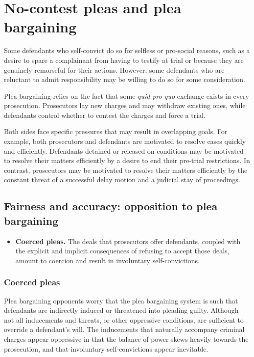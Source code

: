\section{No-contest pleas and plea bargaining}

Some defendants who self-convict do so for selfless or pro-social reasons, such as a desire to spare a complainant from having to testify at trial or because they are genuinely remorseful for their actions. However, some defendants who are reluctant to admit responsibility may be willing to do so for some consideration.

Plea bargaining relies on the fact that some \textit{quid pro quo} exchange exists in every prosecution. Prosecutors lay new charges and may withdraw existing ones, while defendants control whether to contest the charges and force a trial. 

Both sides face specific pressures that may result in overlapping goals. For example, both prosecutors and defendants are motivated to resolve cases quickly and efficiently. Defendants detained or released on conditions may be motivated to resolve their matters efficiently by a desire to end their pre-trial restrictions. In contrast, prosecutors may be motivated to resolve their matters efficiently by the constant threat of a successful delay motion and a judicial stay of proceedings.


\subsection{Fairness and accuracy: opposition to plea bargaining}

\begin{itemize}
\item \textbf{Coerced pleas.} The deals that prosecutors offer defendants, coupled with the explicit and implicit consequences of refusing to accept those deals, amount to coercion and result in involuntary self-convictions.
\end{itemize}

\subsubsection{Coerced pleas}

Plea bargaining opponents worry that the plea bargaining system is such that defendants are indirectly induced or threatened into pleading guilty. Although not all inducements and threats, or other oppressive conditions, are sufficient to override a defendant's will. The inducements that naturally accompany criminal charges appear oppressive in that the balance of power skews heavily towards the prosecution, and that involuntary self-convictions appear inevitable. 

